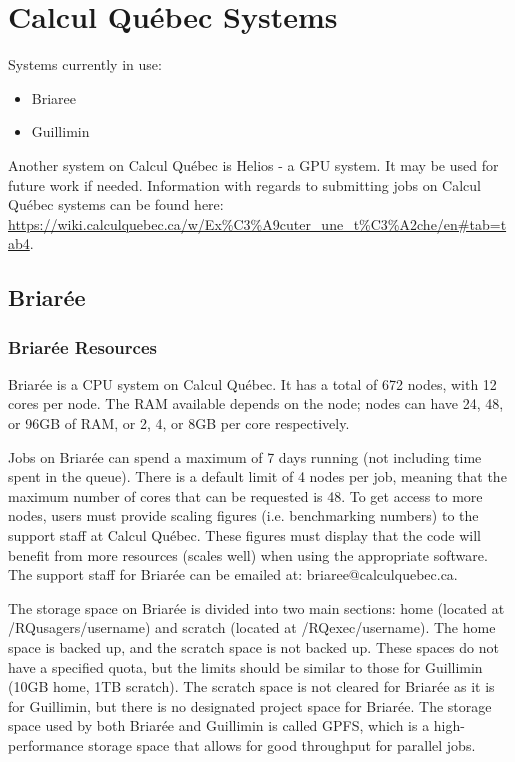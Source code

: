 \documentclass[12pt]{article}
\begin{document}
\section{Calcul Qu\'{e}bec Systems}\label{CalcQ}

\quad Systems currently in use:
\begin{itemize}
\item Briaree
\item Guillimin
\end{itemize}
\quad\enskip\quad Another system on Calcul Qu\'{e}bec is Helios - a GPU system. It may be used for future work if needed. Information with regards to submitting jobs on Calcul Qu\'{e}bec systems can be found here: \url{https://wiki.calculquebec.ca/w/Ex%C3%A9cuter_une_t%C3%A2che/en#tab=tab4}. 


\subsection{Briar\'{e}e}

\subsubsection{Briar\'{e}e Resources}

\quad Briar\'{e}e is a CPU system on Calcul Qu\'{e}bec. It has a total of 672 nodes, with 12 cores per node. The RAM available depends on the node; nodes can have 24, 48, or 96GB of RAM, or 2, 4, or 8GB per core respectively.

\quad Jobs on Briar\'{e}e can spend a maximum of 7 days running (not including time spent in the queue). There is a default limit of 4 nodes per job, meaning that the maximum number of cores that can be requested is 48. To get access to more nodes, users must provide scaling figures (i.e. benchmarking numbers) to the support staff at Calcul Qu\'{e}bec. These figures must display that the code will benefit from more resources (scales well) when using the appropriate software. The support staff for Briar\'{e}e can be emailed at: briaree@calculquebec.ca.

\quad The storage space on Briar\'{e}e is divided into two main sections: home (located at /RQusagers/username) and scratch (located at /RQexec/username). The home space is backed up, and the scratch space is not backed up. These spaces do not have a specified quota, but the limits should be similar to those for Guillimin (10GB home, 1TB scratch). The scratch space is not cleared for Briar\'{e}e as it is for Guillimin, but there is no designated project space for Briar\'{e}e. The storage space used by both Briar\'{e}e and Guillimin is called GPFS, which is a high-performance storage space that allows for good throughput for parallel jobs.
\end{document}
